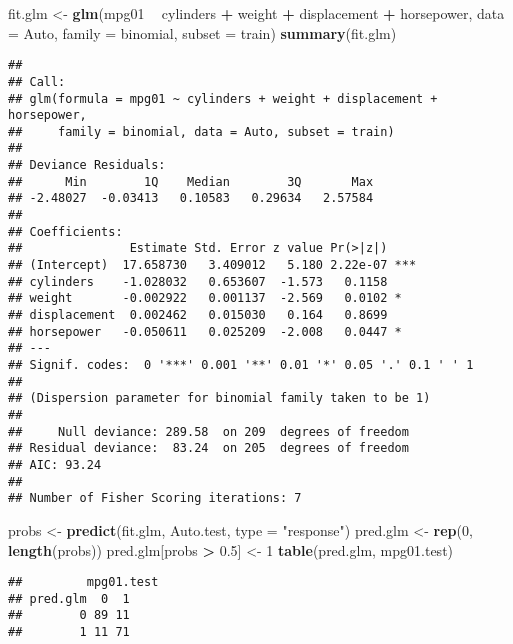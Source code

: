 \documentclass[]{article}
\newenvironment{Shaded}{\begin{snugshade}}{\end{snugshade}}
\newcommand{\KeywordTok}[1]{\textcolor[rgb]{0.13,0.29,0.53}{\textbf{#1}}}
\newcommand{\DataTypeTok}[1]{\textcolor[rgb]{0.13,0.29,0.53}{#1}}
\newcommand{\DecValTok}[1]{\textcolor[rgb]{0.00,0.00,0.81}{#1}}
\newcommand{\FloatTok}[1]{\textcolor[rgb]{0.00,0.00,0.81}{#1}}
\newcommand{\StringTok}[1]{\textcolor[rgb]{0.31,0.60,0.02}{#1}}
\newcommand{\OperatorTok}[1]{\textcolor[rgb]{0.81,0.36,0.00}{\textbf{#1}}}
\newcommand{\NormalTok}[1]{#1}
\begin{document}
\begin{Shaded}
\begin{Highlighting}[]
\NormalTok{fit.glm <-}\StringTok{ }\KeywordTok{glm}\NormalTok{(mpg01 }\OperatorTok{~}\StringTok{ }\NormalTok{cylinders }\OperatorTok{+}\StringTok{ }\NormalTok{weight }\OperatorTok{+}\StringTok{ }\NormalTok{displacement }\OperatorTok{+}\StringTok{ }\NormalTok{horsepower, }\DataTypeTok{data =}\NormalTok{ Auto, }\DataTypeTok{family =}\NormalTok{ binomial, }\DataTypeTok{subset =}\NormalTok{ train)}
\KeywordTok{summary}\NormalTok{(fit.glm)}
\end{Highlighting}
\end{Shaded}

\begin{verbatim}
## 
## Call:
## glm(formula = mpg01 ~ cylinders + weight + displacement + horsepower, 
##     family = binomial, data = Auto, subset = train)
## 
## Deviance Residuals: 
##      Min        1Q    Median        3Q       Max  
## -2.48027  -0.03413   0.10583   0.29634   2.57584  
## 
## Coefficients:
##               Estimate Std. Error z value Pr(>|z|)    
## (Intercept)  17.658730   3.409012   5.180 2.22e-07 ***
## cylinders    -1.028032   0.653607  -1.573   0.1158    
## weight       -0.002922   0.001137  -2.569   0.0102 *  
## displacement  0.002462   0.015030   0.164   0.8699    
## horsepower   -0.050611   0.025209  -2.008   0.0447 *  
## ---
## Signif. codes:  0 '***' 0.001 '**' 0.01 '*' 0.05 '.' 0.1 ' ' 1
## 
## (Dispersion parameter for binomial family taken to be 1)
## 
##     Null deviance: 289.58  on 209  degrees of freedom
## Residual deviance:  83.24  on 205  degrees of freedom
## AIC: 93.24
## 
## Number of Fisher Scoring iterations: 7
\end{verbatim}

\begin{Shaded}
\begin{Highlighting}[]
\NormalTok{probs <-}\StringTok{ }\KeywordTok{predict}\NormalTok{(fit.glm, Auto.test, }\DataTypeTok{type =} \StringTok{"response"}\NormalTok{)}
\NormalTok{pred.glm <-}\StringTok{ }\KeywordTok{rep}\NormalTok{(}\DecValTok{0}\NormalTok{, }\KeywordTok{length}\NormalTok{(probs))}
\NormalTok{pred.glm[probs }\OperatorTok{>}\StringTok{ }\FloatTok{0.5}\NormalTok{] <-}\StringTok{ }\DecValTok{1}
\KeywordTok{table}\NormalTok{(pred.glm, mpg01.test)}
\end{Highlighting}
\end{Shaded}

\begin{verbatim}
##         mpg01.test
## pred.glm  0  1
##        0 89 11
##        1 11 71
\end{verbatim}
\end{document}
